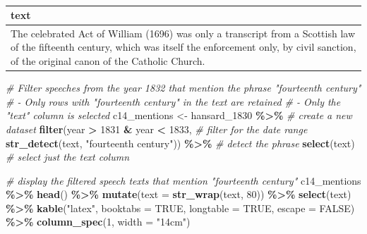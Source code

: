 \documentclass[
]{article}
\newenvironment{Shaded}{\begin{snugshade}}{\end{snugshade}}
\newcommand{\AttributeTok}[1]{\textcolor[rgb]{0.13,0.29,0.53}{#1}}
\newcommand{\CommentTok}[1]{\textcolor[rgb]{0.56,0.35,0.01}{\textit{#1}}}
\newcommand{\ConstantTok}[1]{\textcolor[rgb]{0.56,0.35,0.01}{#1}}
\newcommand{\DecValTok}[1]{\textcolor[rgb]{0.00,0.00,0.81}{#1}}
\newcommand{\FunctionTok}[1]{\textcolor[rgb]{0.13,0.29,0.53}{\textbf{#1}}}
\newcommand{\NormalTok}[1]{#1}
\newcommand{\OtherTok}[1]{\textcolor[rgb]{0.56,0.35,0.01}{#1}}
\newcommand{\SpecialCharTok}[1]{\textcolor[rgb]{0.81,0.36,0.00}{\textbf{#1}}}
\newcommand{\StringTok}[1]{\textcolor[rgb]{0.31,0.60,0.02}{#1}}
\begin{document}
\begin{longtable}[t]{>{\raggedright\arraybackslash}p{14cm}}
\caption{\label{tab:unnamed-chunk-35}}\\
\toprule
text\\
\midrule
The celebrated Act of William (1696) was only a transcript from a Scottish
law of the fifteenth century, which was itself the enforcement only, by civil
sanction, of the original canon of the Catholic Church.\\
\bottomrule
\end{longtable}

\begin{Shaded}
\begin{Highlighting}[]
\CommentTok{\# Filter speeches from the year 1832 that mention the phrase "fourteenth century"}
\CommentTok{\# {-} Only rows with "fourteenth century" in the text are retained}
\CommentTok{\# {-} Only the "text" column is selected}
\NormalTok{c14\_mentions }\OtherTok{\textless{}{-}}\NormalTok{ hansard\_1830 }\SpecialCharTok{\%\textgreater{}\%} \CommentTok{\# create a new dataset}
  \FunctionTok{filter}\NormalTok{(year }\SpecialCharTok{\textgreater{}} \DecValTok{1831} \SpecialCharTok{\&}\NormalTok{ year }\SpecialCharTok{\textless{}} \DecValTok{1833}\NormalTok{, }\CommentTok{\# filter for the date range}
         \FunctionTok{str\_detect}\NormalTok{(text, }\StringTok{"fourteenth century"}\NormalTok{)) }\SpecialCharTok{\%\textgreater{}\%} \CommentTok{\# detect the phrase}
  \FunctionTok{select}\NormalTok{(text) }\CommentTok{\# select just the text column}
\end{Highlighting}
\end{Shaded}

\begin{Shaded}
\begin{Highlighting}[]
\CommentTok{\# display the filtered speech texts that mention "fourteenth century"}
\NormalTok{c14\_mentions }\SpecialCharTok{\%\textgreater{}\%}
  \FunctionTok{head}\NormalTok{() }\SpecialCharTok{\%\textgreater{}\%}
  \FunctionTok{mutate}\NormalTok{(}\AttributeTok{text =} \FunctionTok{str\_wrap}\NormalTok{(text, }\DecValTok{80}\NormalTok{)) }\SpecialCharTok{\%\textgreater{}\%}
  \FunctionTok{select}\NormalTok{(text) }\SpecialCharTok{\%\textgreater{}\%}
  \FunctionTok{kable}\NormalTok{(}\StringTok{"latex"}\NormalTok{, }\AttributeTok{booktabs =} \ConstantTok{TRUE}\NormalTok{, }\AttributeTok{longtable =} \ConstantTok{TRUE}\NormalTok{, }\AttributeTok{escape =} \ConstantTok{FALSE}\NormalTok{) }\SpecialCharTok{\%\textgreater{}\%}
  \FunctionTok{column\_spec}\NormalTok{(}\DecValTok{1}\NormalTok{, }\AttributeTok{width =} \StringTok{"14cm"}\NormalTok{)}
\end{Highlighting}
\end{Shaded}
\end{document}
